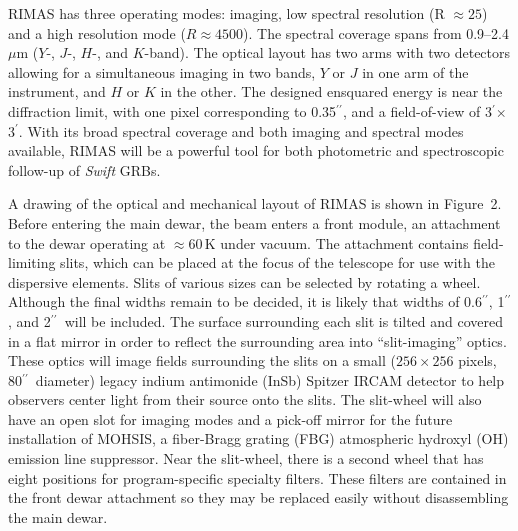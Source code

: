 \documentclass[letterpaper,11pt]{article}
\newcommand{\arcsec}{\mbox{$^{\prime\prime}$}}%
\newcommand{\arcmin}{\mbox{$^\prime$}}%
\begin{document}
RIMAS has three operating modes: imaging, low spectral resolution (R $\approx 25$) and
a high resolution mode ($R \approx 4500$). The spectral coverage spans from 
0.9--2.4\,$\mu$m ($Y$-, $J$-, $H$-, and $K$-band).  The optical layout has two arms 
with two detectors allowing for a simultaneous imaging in two bands, $Y$ or $J$ in 
one arm of the instrument, and $H$ or $K$ in the other.  The designed ensquared
energy is near the diffraction limit, with one pixel corresponding to 0.35\arcsec, 
and a field-of-view of 3\arcmin $\times$ 3\arcmin.  With its broad spectral coverage 
and both imaging and spectral modes available, RIMAS will be a powerful tool for 
both photometric and spectroscopic follow-up of \textit{Swift} GRBs.

\smallskip

A drawing of the optical and mechanical layout of RIMAS is shown in Figure~2.
Before entering the main dewar, the beam enters a front module, an attachment to the 
dewar operating at $\approx 60$\,K under vacuum. The attachment contains field-limiting 
slits, which can be placed at the focus of the telescope for use with the 
dispersive elements. Slits of various sizes can be selected by rotating a wheel. 
Although the final widths remain to be decided, it is likely that widths of 0.6\arcsec, 
1\arcsec, and 2\arcsec\ will be included. The surface surrounding each slit is 
tilted and covered in a flat mirror in order to reflect the surrounding area
into ``slit-imaging'' optics.  These optics will image fields surrounding the 
slits on a small ($256 \times 256$ pixels, 80\arcsec\ diameter) legacy indium antimonide 
(InSb) Spitzer IRCAM detector to help observers center light from their source 
onto the slits.  The slit-wheel will 
also have an open slot for imaging modes and a pick-off mirror for the future 
installation of MOHSIS, a fiber-Bragg grating (FBG) atmospheric hydroxyl (OH) emission 
line suppressor. Near the slit-wheel, there is a second wheel that has eight positions 
for program-specific specialty filters. These filters are contained in the front dewar 
attachment so they may be replaced easily without disassembling the main dewar.
\end{document}
